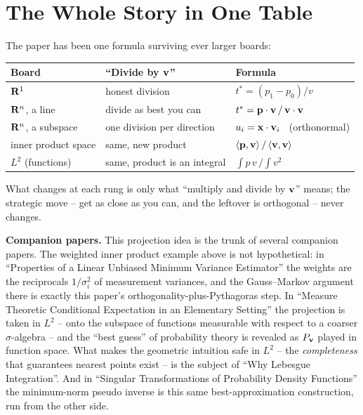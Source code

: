 \documentclass[12pt]{article}
\begin{document}
\section{The Whole Story in One Table}
The paper has been one formula surviving ever larger boards:

\begin{center}
\begin{tabular}{l|l|l}
{\bf Board} & {\bf ``Divide by ${\bf v}$''} & {\bf Formula} \\
\hline
${\bf R}^1$ & honest division & $t^* = (p_1 - p_0)/v$ \\
${\bf R}^n$, a line & divide as best you can & $t^* = {\bf p} \cdot {\bf v} \, / \, {\bf v} \cdot {\bf v}$ \\
${\bf R}^n$, a subspace & one division per direction & $u_i = {\bf x} \cdot {\bf v}_i$ \ (orthonormal) \\
inner product space & same, new product & $\langle {\bf p}, {\bf v}\rangle \, / \, \langle {\bf v}, {\bf v}\rangle$ \\
$L^2$ (functions) & same, product is an integral & $\int p\, v \, \big/ \int v^2$ \\
\end{tabular}
\end{center}

What changes at each rung is only what ``multiply and divide by
${\bf v}$'' means; the strategic move -- get as close as you can, and the
leftover is orthogonal -- never changes.

{\bf Companion papers.} This projection idea is the trunk of several
companion papers. The weighted inner product example above is not
hypothetical: in ``Properties of a Linear Unbiased Minimum Variance
Estimator'' the weights are the reciprocals $1/\sigma_i^2$ of measurement
variances, and the Gauss--Markov argument there is exactly this paper's
orthogonality-plus-Pythagoras step. In ``Measure Theoretic Conditional
Expectation in an Elementary Setting'' the projection is taken in $L^2$ --
onto the subspace of functions measurable with respect to a coarser
$\sigma$-algebra -- and the ``best guess'' of probability theory is
revealed as $P_{\bf v}$ played in function space. What makes the geometric
intuition safe in $L^2$ -- the {\em completeness\/} that guarantees
nearest points exist -- is the subject of ``Why Lebesgue Integration''.
And in ``Singular Transformations of Probability Density Functions'' the
minimum-norm pseudo inverse is this same best-approximation construction,
run from the other side.
\end{document}
